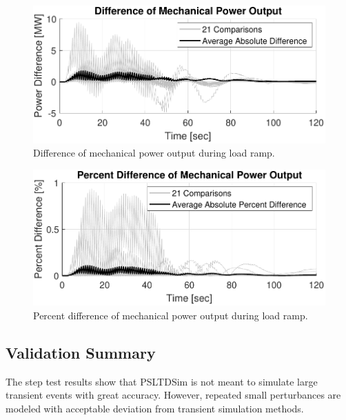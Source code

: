 \begin{figure}[!ht]
	\centering
	\includegraphics[width=\linewidth]{figures/miniWECC3ALTDrampPm2}
	\caption{Difference of mechanical power output during load ramp.}
	\label{fig: rampPmdif}
\end{figure}

\begin{figure}[!ht]
	\centering
	\includegraphics[width=\linewidth]{figures/miniWECC3ALTDrampPm3}
	\caption{Percent difference of mechanical power output during load ramp.}
	\label{fig: rampPmPercentdif}
\end{figure}
\subsection{Validation Summary}
The step test results show that PSLTDSim is not meant to simulate large transient events with great accuracy.
However, repeated small perturbances are modeled with acceptable deviation from transient simulation methods.